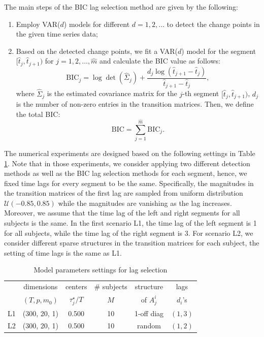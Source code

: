 \documentclass[11pt]{article}
\begin{document}
The main steps of the BIC lag selection method are given by the following:
\begin{enumerate}
    \item Employ VAR($d$) models for different $d = 1,2,\dots$ to detect the change points in the given time series data;
    \item Based on the detected change points, we fit a VAR($d$) model for the segment $[\widehat{t}_j, \widehat{t}_{j+1})$ for $j=1,2,\dots, \widehat{m}$ and calculate the BIC value as follows:
    \begin{equation*}
        \text{BIC}_j = \log \det(\widehat{\Sigma}_j) + \frac{d_j\log (\widehat{t}_{j+1} - \widehat{t}_j)}{\widehat{t}_{j+1} - \widehat{t}_j},
    \end{equation*}
    where $\widehat{\Sigma}_j$ is the estimated covariance matrix for the $j$-th segment $[\widehat{t}_j, \widehat{t}_{j+1})$, $d_j$ is the number of non-zero entries in the transition matrices. Then, we define the total BIC:
    \begin{equation}
        \text{BIC} = \sum_{j=1}^{\widehat{m}}\text{BIC}_j.
    \end{equation}
\end{enumerate}

The numerical experiments are designed based on the following settings in Table \ref{tab:3}. Note that in those experiments, we consider applying two different detection methods as well as the BIC lag selection methods for each segment, hence, we fixed time lags for every segment to be the same. Specifically, the magnitudes in the transition matrices of the first lag are sampled from uniform distribution $\mathcal{U}(-0.85, 0.85)$ while the magnitudes are vanishing as the lag increases. Moreover, we assume that the time lag of the left and right segments for all subjects is the same. In the first scenario L1, the time lag of the left segment is 1 for all subjects, while the time lag of the right segment is 3. For scenario L2, we consider different sparse structures in the transition matrices for each subject, the setting of time lags is the same as L1. 
\begin{table}[!ht]
    \centering
    \caption{Model parameters settings for lag selection}
    \label{tab:3}
    \begin{tabular}{c|c|c|c|c|c}
    \hline\hline
         & dimensions & centers & \# subjects & structure & lags \\
         & $(T, p, m_0)$ & $\tau_j^\star/T$ & $M$ & of $A_j^i$ & $d_i$'s \\ 
    \hline
      L1 & (300, 20, 1) & 0.500 & 10 & 1-off diag & $(1, 3)$ \\
      L2 & (300, 20, 1) & 0.500 & 10 & random & $(1, 2)$ \\
    \hline\hline
    \end{tabular}
\end{table}
\end{document}
